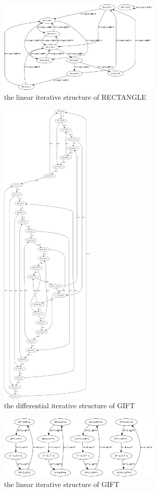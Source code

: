 \begin{figure}
	\centering
	\includegraphics[width=0.7\textwidth]{fig/graph_rect_lat.PNG}
	\caption{the linear iterative structure of RECTANGLE} \label{fig:graph_rect_lat}
\end{figure}

\begin{figure}
	\centering
	\includegraphics[width=0.4\textwidth]{fig/graph_gift_ddt.PNG}
	\caption{the differential iterative structure of GIFT} \label{fig:graph_gift_ddt}
\end{figure}

\begin{figure}
	\centering
	\includegraphics[width=0.7\textwidth]{fig/graph_gift_lat.PNG}
	\caption{the linear iterative structure of GIFT} \label{fig:graph_gift_lat}
\end{figure}
